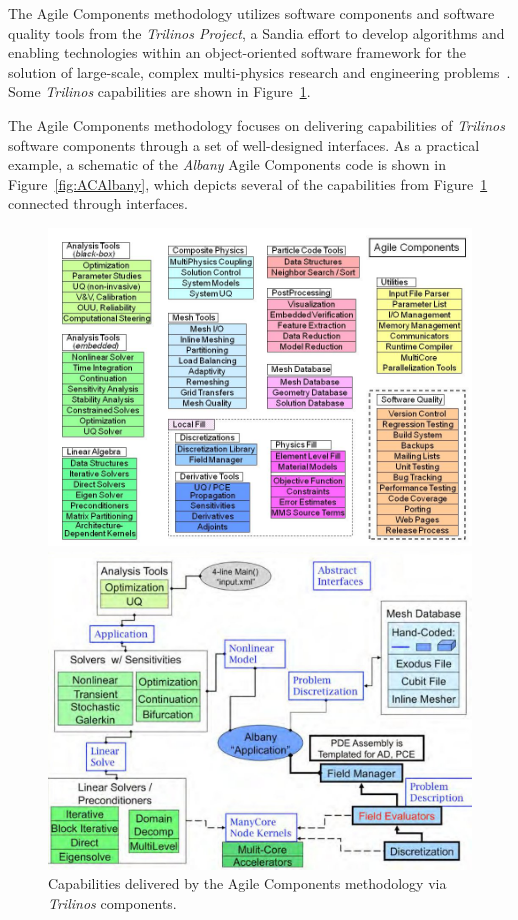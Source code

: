 \documentclass[pdf,ps2pdf,12pt,report]{SANDreport}
\theoremstyle{plain}
\theoremstyle{definition}
\theoremstyle{remark}
\numberwithin{equation}{section}
\begin{document}
The Agile Components methodology utilizes software components and software quality tools from the \emph{Trilinos Project}, a Sandia effort to develop algorithms and enabling technologies within an object-oriented software framework for the solution of large-scale, complex multi-physics research and engineering problems~\cite{Trilinos-Overview}. Some \emph{Trilinos} capabilities are shown in Figure~\ref{fig:ACCapabilities}.

The Agile Components methodology focuses on delivering capabilities of \emph{Trilinos} software components through a set of well-designed interfaces. As a practical example, a schematic of the \emph{Albany} Agile Components code is shown in Figure~\ref{fig:ACAlbany}, which depicts several of the capabilities from Figure~\ref{fig:ACCapabilities} connected through interfaces.
\begin{figure}[htbp]
  \begin{center}
  \begin{minipage}[b]{0.8\linewidth}
    \centering
    \includegraphics[width=\linewidth]{AgileComponents1}
    \caption{Capabilities delivered by the Agile Components methodology via \emph{Trilinos} components.}
    \label{fig:ACCapabilities}
  \end{minipage}
  \begin{minipage}[b]{0.8\linewidth}
    \centering
    \includegraphics[width=0.7\linewidth]{AgileComponents2}

\end{minipage}
\end{center}
\end{figure}
\end{document}
